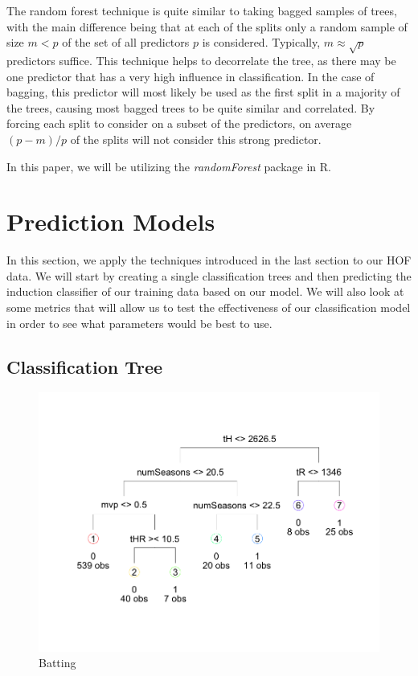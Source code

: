 \documentclass[preprint,12pt]{elsarticle}
\begin{document}
The random forest technique is quite similar to taking bagged  samples of trees, with the main difference being that at each of the splits only a random sample of size $m < p$ of the set of all predictors $p$ is considered. Typically, $m \approx \sqrt{p}$ predictors suffice\cite{Breiman2001}. This technique helps to decorrelate the tree, as there may be one predictor that has a very high influence in classification. In the case of bagging, this predictor will most likely be used as the first split in a majority of the trees, causing most bagged trees to be quite similar and correlated. By forcing each split to consider on a subset of the predictors, on average $(p-m)/p$ of the splits will not consider this strong predictor\cite{Breiman2001}.


In this paper, we will be utilizing the \textit{randomForest} package in R. 

\section{Prediction Models}

In this section, we apply the techniques introduced in the last section to our HOF data. We will start by creating a single classification trees and then predicting the induction classifier of our training data based on our model. We will also look at some metrics that will allow us to test the effectiveness of our classification model in order to see what parameters would be best to use. 

\subsection{Classification Tree}

\begin{figure}[h]
       \centering 
       \includegraphics[width=\linewidth]{BatterUnpruned}
       \caption{Batting}
       \label{unprunedBat}
 \end{figure}
\end{document}
